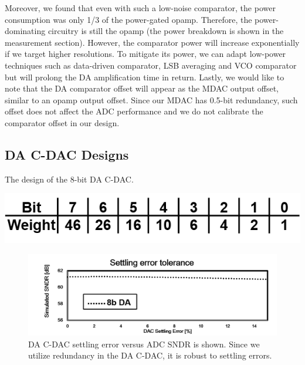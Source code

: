 Moreover, we found that even with such a low-noise comparator, the power consumption was only 1/3 of the power-gated opamp. Therefore, the power-dominating circuitry is still the opamp (the power breakdown is shown in the measurement section). However, the comparator power will increase exponentially if we target higher resolutions. To mitigate its power, we can adapt low-power techniques such as data-driven comparator\cite{harpe20132}, LSB averaging\cite{moriesaradc} and VCO comparator\cite{yoshiokaVCO} but will prolong the DA amplification time in return. Lastly, we would like to note that the DA comparator offset will appear as the MDAC output offset, similar to an opamp output offset. Since our MDAC has 0.5-bit redundancy, such offset does not affect the ADC performance and we do not calibrate the comparator offset in our design. 

\subsection{DA C-DAC Designs}
\begin{table}[!]
\centering
  \caption{The design of the 8-bit DA C-DAC.}
  \label{tbl:Cdac}
 \includegraphics[width=1\textwidth]{figure/chap2/table-cdac.png}
\end{table}

\begin{figure}[!]
\centering
  \includegraphics[width=1\textwidth]{figure/chap2/settling-cdac.png}
  \caption{DA C-DAC settling error versus ADC SNDR is shown. Since we utilize redundancy in the DA C-DAC, it is robust to settling errors.}
  \label{fig-cdac-settling}
\end{figure}

